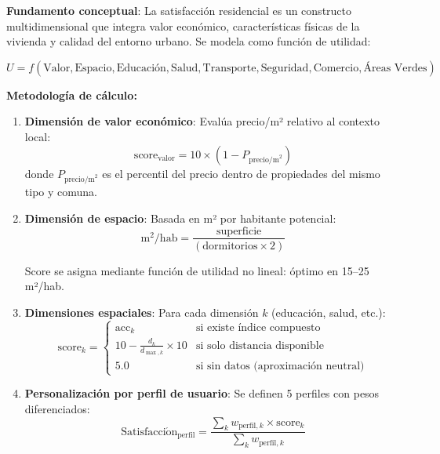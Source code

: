 \textbf{Fundamento conceptual}: La satisfacción residencial es un constructo multidimensional que integra valor económico, características físicas de la vivienda y calidad del entorno urbano. Se modela como función de utilidad:

\begin{equation}
U = f(\text{Valor}, \text{Espacio}, \text{Educación}, \text{Salud}, \text{Transporte}, \text{Seguridad}, \text{Comercio}, \text{Áreas Verdes})
\end{equation}

\textbf{Metodología de cálculo:}
\begin{enumerate}
    \item \textbf{Dimensión de valor económico}: Evalúa precio/m² relativo al contexto local:
    \begin{equation}
    \text{score}_{\text{valor}} = 10 \times (1 - P_{\text{precio/m}^2})
    \end{equation}
    donde $P_{\text{precio/m}^2}$ es el percentil del precio dentro de propiedades del mismo tipo y comuna.
    
    \item \textbf{Dimensión de espacio}: Basada en m² por habitante potencial:
    \begin{equation}
    \text{m}^2/\text{hab} = \frac{\text{superficie}}{(\text{dormitorios} \times 2)}
    \end{equation}
    
    Score se asigna mediante función de utilidad no lineal: óptimo en 15--25 m²/hab.
    
    \item \textbf{Dimensiones espaciales}: Para cada dimensión $k$ (educación, salud, etc.):
    \begin{equation}
    \text{score}_k = \begin{cases}
    \text{acc}_k & \text{si existe índice compuesto} \\
    10 - \frac{d_k}{d_{\max,k}} \times 10 & \text{si solo distancia disponible} \\
    5.0 & \text{si sin datos (aproximación neutral)}
    \end{cases}
    \end{equation}
    
    \item \textbf{Personalización por perfil de usuario}: Se definen 5 perfiles con pesos diferenciados:
    \begin{equation}
    \text{Satisfacci}\acute{\text{o}}\text{n}_{\text{perfil}} = \frac{\sum_{k} w_{\text{perfil},k} \times \text{score}_k}{\sum_{k} w_{\text{perfil},k}}
    \end{equation}
    

\end{enumerate}
